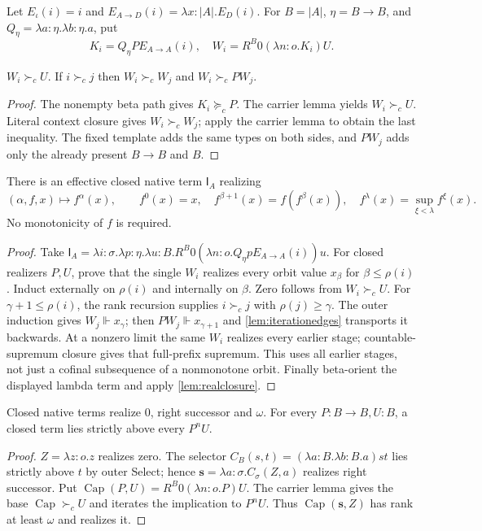 \documentclass[11pt,a4paper]{article}
\newcommand{\rk}{\rho}
\newcommand{\It}{\mathsf I}
\begin{document}
Let $E_{\iota}(i)=i$ and
$E_{A\to D}(i)=\lambda x:|A|.E_D(i)$.
For $B=|A|$, $\eta=B\to B$, and $Q_\eta=\lambda a:\eta.\lambda b:\eta.a$, put
\[
 K_i=Q_\eta P E_{A\to A}(i),\quad
 W_i=R^B0(\lambda n:o.K_i)U.
\]
\begin{lemma}\label{lem:iterationedges}
$W_i\succ_cU$.  If $i\succ_cj$ then
$W_i\succ_cW_j$ and $W_i\succ_cPW_j$.
\end{lemma}
\begin{proof}
The nonempty beta path gives $K_i\succeq_cP$.  The carrier lemma yields
$W_i\succ_cU$.  Literal context closure gives $W_i\succ_cW_j$; apply
the carrier lemma to obtain the last inequality.  The fixed template adds
the same types on both sides, and $PW_j$ adds only the already present
$B\to B$ and $B$.
\end{proof}

\begin{theorem}\label{thm:iteration}
There is an effective closed native term $\It_A$ realizing
\[
 (\alpha,f,x)\longmapsto f^\alpha(x),\qquad
 f^0(x)=x,\quad f^{\beta+1}(x)=f(f^\beta(x)),\quad
 f^\lambda(x)=\sup_{\xi<\lambda}f^\xi(x).
\]
No monotonicity of $f$ is required.
\end{theorem}
\begin{proof}
Take $\It_A=\lambda i:\sigma.\lambda p:\eta.\lambda u:B.
R^B0(\lambda n:o.Q_\eta p E_{A\to A}(i))u$.
For closed realizers $P,U$, prove that the single $W_i$ realizes every orbit
value $x_\beta$ for $\beta\le\rk(i)$.  Induct externally on $\rk(i)$ and
internally on $\beta$.  Zero follows from $W_i\succ_cU$.
For $\gamma+1\le\rk(i)$, the rank recursion supplies $i\succ_cj$ with
$\rk(j)\ge\gamma$.  The outer induction gives $W_j\Vdash x_\gamma$;
then $PW_j\Vdash x_{\gamma+1}$ and \ref{lem:iterationedges} transports it
backwards.  At a nonzero limit the same $W_i$ realizes every earlier stage;
countable-supremum closure gives that full-prefix supremum.  This uses all
earlier stages, not just a cofinal subsequence of a nonmonotone orbit.
Finally beta-orient the displayed lambda term and apply
\ref{lem:realclosure}.
\end{proof}

\begin{lemma}\label{lem:primitives}
Closed native terms realize $0$, right successor and $\omega$.
For every $P:B\to B,U:B$, a closed term lies strictly above every $P^nU$.
\end{lemma}
\begin{proof}
$Z=\lambda z:o.z$ realizes zero.  The selector
$C_B(s,t)=(\lambda a:B.\lambda b:B.a)st$ lies strictly above $t$ by outer
Select; hence $\mathbf s=\lambda a:\sigma.C_\sigma(Z,a)$ realizes right
successor.  Put $\operatorname{Cap}(P,U)=R^B0(\lambda n:o.P)U$.
The carrier lemma gives the base $\operatorname{Cap}\succ_cU$ and iterates
the implication to $P^nU$.  Thus $\operatorname{Cap}(\mathbf s,Z)$ has rank
at least $\omega$ and realizes it.
\end{proof}
\end{document}
